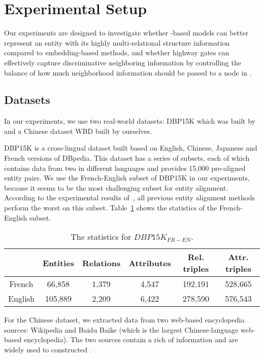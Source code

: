 \section{Experimental Setup}
	Our experiments are designed to investigate whether \RGCN-based models can better represent an entity with its highly multi-relational
structure information compared to \KG embedding-based methods, and whether highway gates can effectively capture discriminative neighboring
information by controlling the balance of how much neighborhood information should be passed to a node in \RGCN.

\subsection{Datasets}
\label{subsection:datasets}
	In our experiments, we use two real-world datasets: DBP15K which was built by~\cite{sun2017cross} and a Chinese dataset WBD built by ourselves. 
	
	DBP15K is a cross-lingual dataset built based on English, Chinese, Japanese and French versions of DBpedia. 
	This dataset has a series of subsets, each of which contains data from two \KGs in different languages and provides 15,000 pre-aligned entity pairs. 
	We use the French-English subset of DBP15K in our experiments, because it seems to be the most challenging subset for entity alignment. 
	According to the experimental results of~\cite{sun2017cross}, all previous entity alignment methods perform the worst on this subset. Table~\ref{dbp} shows the statistics of the French-English subset.
	
		\begin{table}
		\centering
		\scriptsize
		\begin{tabular}{c|ccccc}
			\toprule
			&\bf  Entities &\bf  Relations &\bf  Attributes &\bf  Rel. triples &\bf  Attr. triples \\
			\midrule
			French & 66,858 & 1,379 & 4,547 & 192,191 & 528,665 \\ 
			English & 105,889 & 2,209 & 6,422 & 278,590 & 576,543 \\
			\bottomrule
		\end{tabular}
		\caption{The statistics for $DBP15K_{FR-EN}$.}
		\label{dbp}
	\end{table}
	
    For the Chinese dataset, we extracted data from two web-based encyclopedia sources: Wikipedia and Baidu Baike (which is the largest Chinese-language web-based encyclopedia). 
    The two sources contain a rich of information and are widely used to constructed \KGs.
	

